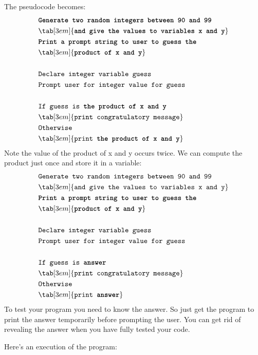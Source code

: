 The pseudocode becomes:
\begin{align*}
&\textbf{\texttt{Generate two random integers between 90 and 99}}\\
&\tab[3em]{\texttt{\textbf{and give the values to variables x and y}}}\\
&\textbf{\texttt{Print a prompt string to user to guess the}}\\
&\tab[3em]{\texttt{\textbf{product of x and y}}}\\\\
&\texttt{Declare integer variable guess}\\
&\texttt{Prompt user for integer value for guess}\\\\
&\texttt{If guess is \textbf{the product of x and y}}\\
&\tab[3em]{\texttt{print congratulatory message}}\\
&\texttt{Otherwise}\\
&\tab[3em]{\texttt{print \textbf{the product of x and y}}}\\
\end{align*}
Note the value of the product of x and y occurs twice. We can compute
the product just once and store it in a variable:
\begin{align*}
&{\texttt{Generate two random integers between 90 and 99}}\\
&\tab[3em]{\texttt{{and give the values to variables x and y}}}\\
&\textbf{\texttt{Print a prompt string to user to guess the}}\\
&\tab[3em]{\texttt{\textbf{product of x and y}}}\\\\
&\texttt{Declare integer variable guess}\\
&\texttt{Prompt user for integer value for guess}\\\\
&\texttt{If guess is \textbf{answer}}\\
&\tab[3em]{\texttt{print congratulatory message}}\\
&\texttt{Otherwise}\\
&\tab[3em]{\texttt{print \textbf{answer}}}
\end{align*}
To test your program you need to know the answer. So just get the
program to print the answer temporarily before prompting the user. You
can get rid of revealing the answer when you have fully tested your
code.

Here's an execution of the program:\\

